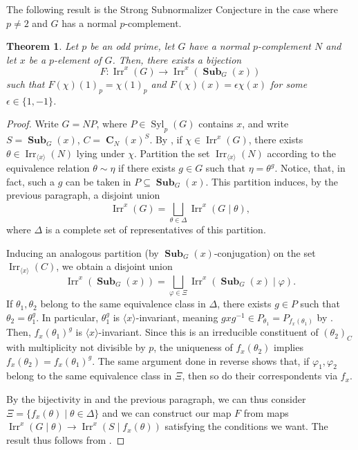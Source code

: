 \documentclass[12pt]{amsart}
\DeclareMathOperator{\CB}{\mathbf{C}}
\DeclareMathOperator{\Syl}{Syl}
\DeclareMathOperator{\Sub}{\mathbf{Sub}}
\DeclareMathOperator{\Irr}{Irr}
\theoremstyle{remark}
\theoremstyle{definition}
\theoremstyle{plain}
\newtheorem{thm}{Theorem}[section]
\theoremstyle{definition}
\numberwithin{equation}{section}
\begin{document}
The following result is the Strong Subnormalizer Conjecture in the case where $p \neq 2$ and $G$ has a normal $p$-complement.

\begin{thm}
	\label{SubConjNormalPComplement}
	Let $p$ be an odd prime, let $G$ have a normal $p$-complement $N$ and let $x$ be a $p$-element of $G$. Then, there exists a bijection $$F: \Irr^x(G) \to \Irr^x(\Sub_G(x))$$ such that $F(\chi)(1)_p = \chi(1)_p$ and $F(\chi)(x) = \epsilon \chi(x)$ for some $\epsilon \in \{1, -1\}$.
\end{thm}

\begin{proof}
	Write $G = NP$, where $P \in \Syl_p(G)$ contains $x$, and write $S = \Sub_G(x)$, $C = \CB_N(x)^S$. By , if $\chi \in \Irr^x(G)$, there exists $\theta \in \Irr_{\langle x \rangle}(N)$ lying under $\chi$. Partition the set $\Irr_{\langle x \rangle}(N)$ according to the equivalence relation $\theta \sim \eta$ if there exists $g \in G$ such that $\eta = \theta^g$. Notice, that, in fact, such a $g$ can be taken in $P \subseteq \Sub_G(x)$. This partition induces, by the previous paragraph, a disjoint union 
	\begin{equation*}
		\Irr^x(G) = \bigsqcup_{\theta \in \Delta} \Irr^x(G\mid \theta),
	\end{equation*}
	where $\Delta$ is a complete set of representatives of this partition.
	
	Inducing an analogous partition (by $\Sub_G(x)$-conjugation) on the set $\Irr_{\langle x \rangle}(C)$, we obtain a disjoint union
	\begin{equation*}
		\Irr^x(\Sub_G(x)) = \bigsqcup_{\varphi \in \Xi} \Irr^x(\Sub_G(x) \mid \varphi).
	\end{equation*}
	If $\theta_1, \theta_2$ belong to the same equivalence class in $\Delta$, there exists $g \in P$ such that $\theta_2 = \theta_1^g$. In particular, $\theta_1^g$ is $\langle x \rangle$-invariant, meaning $gxg^{-1} \in P_{\theta_1} = P_{f_x(\theta_1)}$ by . Then, $f_x(\theta_1)^g$ is $\langle x \rangle$-invariant. Since this is an irreducible constituent of $(\theta_2)_C$ with multiplicity not divisible by $p$, the uniqueness of $f_x(\theta_2)$ implies $f_x(\theta_2) = f_x(\theta_1)^g$. The same argument done in reverse shows that, if $\varphi_1, \varphi_2$ belong to the same equivalence class in $\Xi$, then so do their correspondents via $f_x$.
	
	By the bijectivity in  and the previous paragraph, we can thus consider $\Xi = \{f_x(\theta) \mid \theta \in \Delta\}$ and we can construct our map $F$ from maps $\Irr^x(G \mid \theta) \to \Irr^x(S \mid f_x(\theta))$ satisfying the conditions we want. The result thus follows from .
\end{proof}
\end{document}
